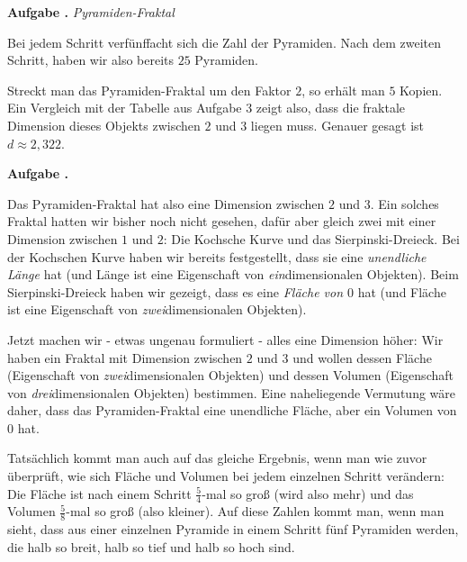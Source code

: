\documentclass[a4paper,ngerman,12pt]{scrartcl}
\theoremstyle{definition}
\theoremstyle{plain}
\theoremstyle{remark}
\newlength{\aufgabenskip}
\newcounter{aufgabennummer}
\newenvironment{aufgabe}[1]{
  \addtocounter{aufgabennummer}{1}
  \textbf{Aufgabe \theaufgabennummer.} \emph{#1} \par
}{\vspace{\aufgabenskip}}
\begin{document}
\begin{aufgabe}{Pyramiden-Fraktal}
	Bei jedem Schritt verfünffacht sich die Zahl der Pyramiden. Nach dem zweiten Schritt, haben wir also bereits $25$ Pyramiden.
	
	Streckt man das Pyramiden-Fraktal um den Faktor $2$, so erhält man $5$ Kopien. Ein Vergleich mit der Tabelle aus Aufgabe 3 zeigt also, dass die fraktale Dimension dieses Objekts zwischen $2$ und $3$ liegen muss. Genauer gesagt ist $d \approx 2,322$.
\end{aufgabe}
	
\begin{aufgabe}{}
	Das Pyramiden-Fraktal hat also eine Dimension zwischen $2$ und $3$. Ein solches Fraktal hatten wir bisher noch nicht gesehen, dafür aber gleich zwei mit einer Dimension zwischen $1$ und $2$: Die Kochsche Kurve und das Sierpinski-Dreieck. Bei der Kochschen Kurve haben wir bereits festgestellt, dass sie eine \emph{unendliche Länge} hat (und Länge ist eine Eigenschaft von \emph{ein}dimensionalen Objekten). Beim Sierpinski-Dreieck haben wir gezeigt, dass es eine \emph{Fläche von $0$} hat (und Fläche ist eine Eigenschaft von \emph{zwei}dimensionalen Objekten).
	
	Jetzt machen wir - etwas ungenau formuliert - \glqq alles eine Dimension höher\grqq: Wir haben ein Fraktal mit Dimension zwischen $2$ und $3$ und wollen dessen Fläche (Eigenschaft von \emph{zwei}dimensionalen Objekten) und dessen Volumen (Eigenschaft von \emph{drei}dimensionalen Objekten) bestimmen. Eine naheliegende Vermutung wäre daher, dass das Pyramiden-Fraktal eine unendliche Fläche, aber ein Volumen von $0$ hat.
	
	Tatsächlich kommt man auch auf das gleiche Ergebnis, wenn man wie zuvor überprüft, wie sich Fläche und Volumen bei jedem einzelnen Schritt verändern:
	Die Fläche ist nach einem Schritt $\frac{5}{4}$-mal so groß (wird also mehr) und das Volumen $\frac{5}{8}$-mal so groß (also kleiner). Auf diese Zahlen kommt man, wenn man sieht, dass aus einer einzelnen Pyramide in einem Schritt fünf Pyramiden werden, die halb so breit, halb so tief und halb so hoch sind.
\end{aufgabe}
\end{document}
